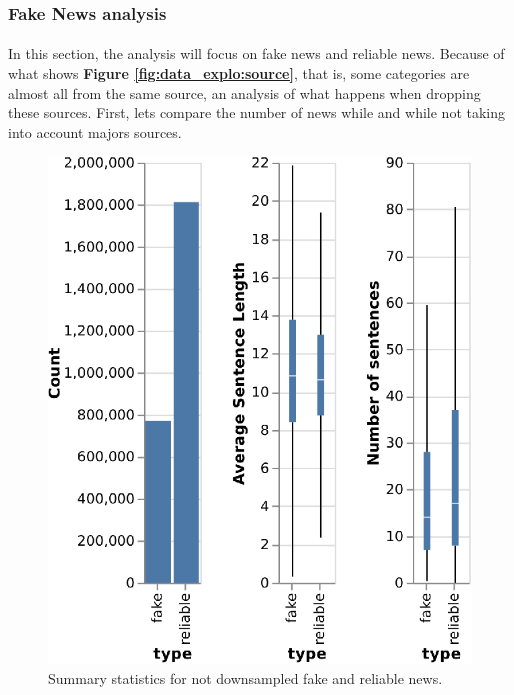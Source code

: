 \subsubsection{Fake News analysis}
\paragraph{} In this section, the analysis will focus on fake news and reliable news. Because of what shows \textbf{Figure \ref{fig:data_explo:source}}, that is, some categories are almost all from the same source, an analysis of what happens when dropping these sources. First, lets compare the number of news while and while not taking into account majors sources. 

\begin{figure}[h]
  \centering
  \includegraphics[]{chapter/images/data_exploration/not_downsampled.eps}
  \caption{Summary statistics for not downsampled fake and reliable news.}
  \label{fig:data_explo:summary1}
\end{figure}

